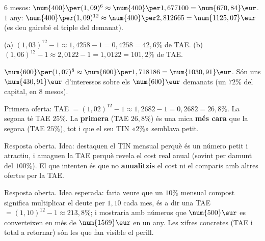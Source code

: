 \begin{solucions}
\begin{sollist}
  \item $6$ mesos: $\num{400}\per (1,09)^{6}\approx\num{400}\per 1,677100=\num{670,84}\eur$.
        $1$ any: $\num{400}\per (1,09)^{12}\approx\num{400}\per 2,812665=\num{1125,07}\eur$
        (es deu gairebé el triple del demanat).
  \item (a) $(1,03)^{12}-1\approx 1,4258-1=0,4258=42,6\%$ de TAE. \quad
        (b) $(1,06)^{12}-1\approx 2,0122-1=1,0122=101,2\%$ de TAE.
  \item $\num{600}\per (1,07)^{8}\approx\num{600}\per 1,718186=\num{1030,91}\eur$. Són
        uns $\num{430,91}\eur$ d'interessos sobre els $\num{600}\eur$ demanats (un
        $72\%$ del capital, en $8$ mesos).
  \item Primera oferta: TAE $=(1,02)^{12}-1\approx 1,2682-1=0,2682=26,8\%$. La segona
        té TAE $25\%$. La \textbf{primera} (TAE $26,8\%$) és una mica \textbf{més cara}
        que la segona (TAE $25\%$), tot i que el seu TIN «$2\%$» semblava petit.
  \item Resposta oberta. Idea: destaquen el TIN mensual perquè és un número petit i
        atractiu, i amaguen la TAE perquè revela el cost real anual (sovint per damunt
        del $100\%$). El que intenten és que no \textbf{anualitzis} el cost ni el
        comparis amb altres ofertes per la TAE.
  \item Resposta oberta. Idea esperada: faria veure que un $10\%$ mensual compost
        significa multiplicar el deute per $1,10$ cada mes, és a dir una TAE
        $=(1,10)^{12}-1\approx 213,8\%$; i mostraria amb números que $\num{500}\eur$ es
        converteixen en més de $\num{1569}\eur$ en un any. Les xifres concretes (TAE i
        total a retornar) són les que fan visible el perill.
\end{sollist}
\end{solucions}
